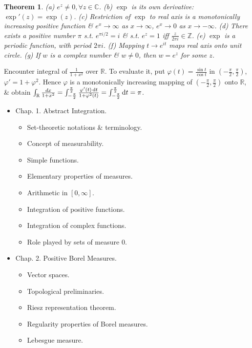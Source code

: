 \documentclass{article}
\newtheorem{theorem}{Theorem}
\begin{document}
\begin{itemize}
	\begin{theorem}
		(a) $e^z\ne0,\forall z\in\mathbb{C}$. (b) $\exp$ is its own derivative: $\exp'(z) = \exp(z)$. (c) Restriction of $\exp$ to real axis is a monotonically increasing positive function \& $e^x\to\infty$ as $x\to\infty$, $e^x\to0$ as $x\to-\infty$. (d) There exists a positive number $\pi$ s.t. $e^{\pi i/2} = i$ \& s.t. $e^z = 1$ iff $\frac{z}{2\pi i}\in\mathbb{Z}$. (e) $\exp$ is a periodic function, with period $2\pi i$. (f) Mapping $t\to e^{it}$ maps real axis onto unit circle. (g) If $w$ is a complex number \& $w\ne0$, then $w = e^z$ for some $z$.
	\end{theorem}
	Encounter integral of $\frac{1}{1 + x^2}$ over $\mathbb{R}$. To evaluate it, put $\varphi(t) = \frac{\sin t}{\cos t}$ in $(-\frac{\pi}{2},\frac{\pi}{2})$, $\varphi' = 1 + \varphi^2$. Hence $\varphi$ is a monotonically increasing mapping of $(-\frac{\pi}{2},\frac{\pi}{2})$ onto $\mathbb{R}$, \& obtain $\int_\mathbb{R} \frac{dx}{1 + x^2} = \int_{-\frac{\pi}{2}}^{\frac{\pi}{2}} \frac{\varphi'(t)\,{\rm d}t}{1 + \varphi^2(t)} = \int_{-\frac{\pi}{2}}^{\frac{\pi}{2}} {\rm d}t = \pi$.
	\begin{itemize}
		\item {\sf Chap. 1. Abstract Integration.}
		\begin{itemize}
			\item {\sf Set-theoretic notations \& terminology.}
			\item {\sf Concept of measurability.}
			\item {\sf Simple functions.}
			\item {\sf Elementary properties of measures.}
			\item {\sf Arithmetic in $[0,\infty]$.}
			\item {\sf Integration of positive functions.}
			\item {\sf Integration of complex functions.}
			\item {\sf Role played by sets of measure 0.}
		\end{itemize}
		\item {\sf Chap. 2. Positive Borel Measures.}
		\begin{itemize}
			\item {\sf Vector spaces.}
			\item {\sf Topological preliminaries.}
			\item {\sf Riesz representation theorem.}
			\item {\sf Regularity properties of Borel measures.}
			\item {\sf Lebesgue measure.}

\end{itemize}
\end{itemize}
\end{itemize}
\end{document}
